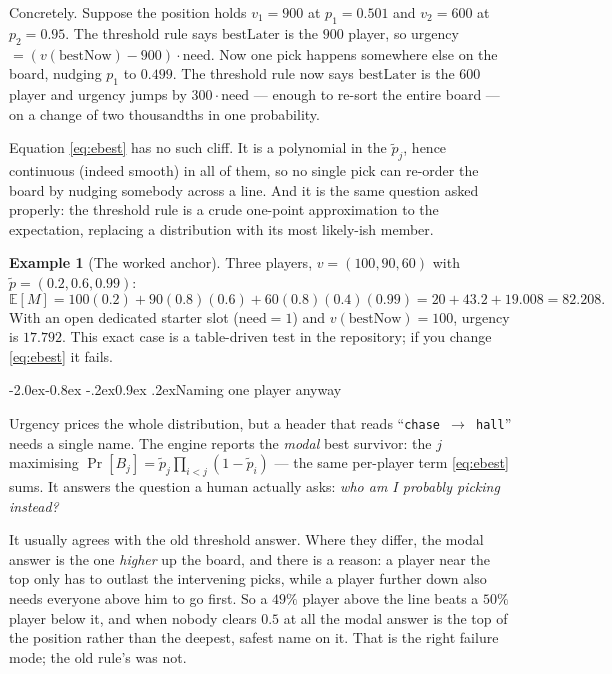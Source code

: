 \documentclass[10pt,a4paper]{article}
\makeatletter
\theoremstyle{plain}
\theoremstyle{definition}
\newtheorem{example}[theorem]{Example}
\theoremstyle{remark}
\newcommand{\code}[1]{\texttt{\small #1}}
\renewcommand\subsection{\@startsection{subsection}{2}{\z@}%
  {-2.0ex\@plus -0.8ex \@minus -.2ex}{0.9ex \@plus .2ex}{\normalfont\large\bfseries}}
\makeatother
\begin{document}
Concretely. Suppose the position holds $v_1 = 900$ at $p_1 = 0.501$ and $v_2 = 600$ at
$p_2 = 0.95$. The threshold rule says $\mathrm{bestLater}$ is the $900$ player, so
urgency $= (v(\text{bestNow}) - 900)\cdot \mathrm{need}$. Now one pick happens
somewhere else on the board, nudging $p_1$ to $0.499$. The threshold rule now says
$\mathrm{bestLater}$ is the $600$ player and urgency jumps by $300 \cdot \mathrm{need}$
--- enough to re-sort the entire board --- on a change of two thousandths in one
probability.

Equation \eqref{eq:ebest} has no such cliff. It is a polynomial in the $\tilde p_j$, hence
continuous (indeed smooth) in all of them, so no single pick can re-order the board by
nudging somebody across a line. And it is the same question asked properly: the
threshold rule is a crude one-point approximation to the expectation, replacing a
distribution with its most likely-ish member.

\begin{example}[The worked anchor]
Three players, $v = (100, 90, 60)$ with $\tilde p = (0.2, 0.6, 0.99)$:
\[
\mathbb{E}[M] = 100(0.2) + 90(0.8)(0.6) + 60(0.8)(0.4)(0.99)
= 20 + 43.2 + 19.008 = 82.208 .
\]
With an open dedicated starter slot ($\mathrm{need} = 1$) and $v(\mathrm{bestNow}) = 100$,
urgency is $17.792$. This exact case is a table-driven test in the repository; if you
change \eqref{eq:ebest} it fails.
\end{example}

\subsection{Naming one player anyway}

Urgency prices the whole distribution, but a header that reads
``\code{chase $\to$ hall}'' needs a single name. The engine reports the \emph{modal}
best survivor: the $j$ maximising $\Pr[B_j] = \tilde p_j\prod_{i<j}(1-\tilde p_i)$ ---
the same per-player term \eqref{eq:ebest} sums. It answers the question a human actually
asks: \emph{who am I probably picking instead?}

It usually agrees with the old threshold answer. Where they differ, the modal answer is
the one \emph{higher} up the board, and there is a reason: a player near the top only
has to outlast the intervening picks, while a player further down also needs everyone
above him to go first. So a $49\%$ player above the line beats a $50\%$ player below it,
and when nobody clears $0.5$ at all the modal answer is the top of the position rather
than the deepest, safest name on it. That is the right failure mode; the old rule's was
not.
\end{document}
